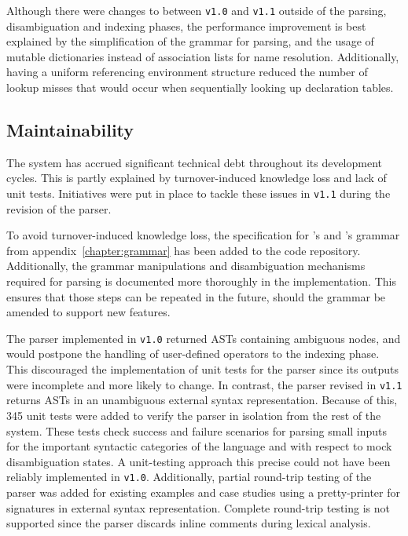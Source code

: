 Although there were changes to \Beluga between \texttt{v1.0} and \texttt{v1.1} outside of the parsing, disambiguation and indexing phases, the performance improvement is best explained by the simplification of the grammar for parsing, and the usage of mutable dictionaries instead of association lists for name resolution.
Additionally, having a uniform referencing environment structure reduced the number of lookup misses that would occur when sequentially looking up declaration tables.

\subsection*{Maintainability}


The \Beluga system has accrued significant technical debt throughout its development cycles.
This is partly explained by turnover-induced knowledge loss and lack of unit tests.
Initiatives were put in place to tackle these issues in \texttt{v1.1} during the revision of the parser.


To avoid turnover-induced knowledge loss, the specification for \Beluga's and \Harpoon's grammar from appendix~\ref{chapter:grammar} has been added to the code repository.
Additionally, the grammar manipulations and disambiguation mechanisms required for parsing is documented more thoroughly in the implementation.
This ensures that those steps can be repeated in the future, should the grammar be amended to support new features.

The parser implemented in \texttt{v1.0} returned \acp{AST} containing ambiguous nodes, and would postpone the handling of user-defined operators to the indexing phase.
This discouraged the implementation of unit tests for the parser since its outputs were incomplete and more likely to change.
In contrast, the parser revised in \texttt{v1.1} returns \acp{AST} in an unambiguous external syntax representation.
Because of this, \num{345} unit tests were added to verify the parser in isolation from the rest of the system.
These tests check success and failure scenarios for parsing small inputs for the important syntactic categories of the language and with respect to mock disambiguation states.
A unit-testing approach this precise could not have been reliably implemented in \texttt{v1.0}.
Additionally, partial round-trip testing of the parser was added for existing \Beluga examples and case studies using a pretty-printer for signatures in external syntax representation.
Complete round-trip testing is not supported since the parser discards inline comments during lexical analysis.


